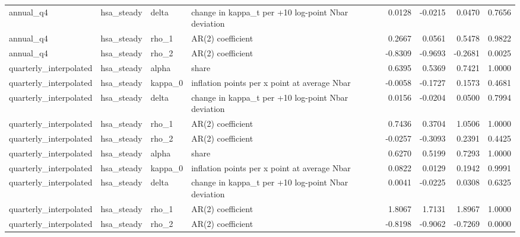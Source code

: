 \begin{tabular}{llllrrrr}
annual\_q4 & hsa\_steady & delta & change in kappa\_t per +10 log-point Nbar deviation & 0.0128 & -0.0215 & 0.0470 & 0.7656 \\
annual\_q4 & hsa\_steady & rho\_1 & AR(2) coefficient & 0.2667 & 0.0561 & 0.5478 & 0.9822 \\
annual\_q4 & hsa\_steady & rho\_2 & AR(2) coefficient & -0.8309 & -0.9693 & -0.2681 & 0.0025 \\
quarterly\_interpolated & hsa\_steady & alpha & share & 0.6395 & 0.5369 & 0.7421 & 1.0000 \\
quarterly\_interpolated & hsa\_steady & kappa\_0 & inflation points per x point at average Nbar & -0.0058 & -0.1727 & 0.1573 & 0.4681 \\
quarterly\_interpolated & hsa\_steady & delta & change in kappa\_t per +10 log-point Nbar deviation & 0.0156 & -0.0204 & 0.0500 & 0.7994 \\
quarterly\_interpolated & hsa\_steady & rho\_1 & AR(2) coefficient & 0.7436 & 0.3704 & 1.0506 & 1.0000 \\
quarterly\_interpolated & hsa\_steady & rho\_2 & AR(2) coefficient & -0.0257 & -0.3093 & 0.2391 & 0.4425 \\
quarterly\_interpolated & hsa\_steady & alpha & share & 0.6270 & 0.5199 & 0.7293 & 1.0000 \\
quarterly\_interpolated & hsa\_steady & kappa\_0 & inflation points per x point at average Nbar & 0.0822 & 0.0129 & 0.1942 & 0.9991 \\
quarterly\_interpolated & hsa\_steady & delta & change in kappa\_t per +10 log-point Nbar deviation & 0.0041 & -0.0225 & 0.0308 & 0.6325 \\
quarterly\_interpolated & hsa\_steady & rho\_1 & AR(2) coefficient & 1.8067 & 1.7131 & 1.8967 & 1.0000 \\
quarterly\_interpolated & hsa\_steady & rho\_2 & AR(2) coefficient & -0.8198 & -0.9062 & -0.7269 & 0.0000 \\
\bottomrule
\end{tabular}
